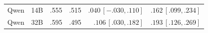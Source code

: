 \documentclass[letterpaper]{article} %
\begin{document}
\begin{table}[t]
\begin{tabular}{llrrrr}
Qwen  & 14B  & .555 & .515 & $.040\,[-.030,.110]$  & $.162\,[.099,.234]$ \\ %
Qwen  & 32B  & .595 & .495 & $.106\,[.030,.182]$   & $.193\,[.126,.269]$ \\ %

\end{tabular}
\end{table}
\end{document}
